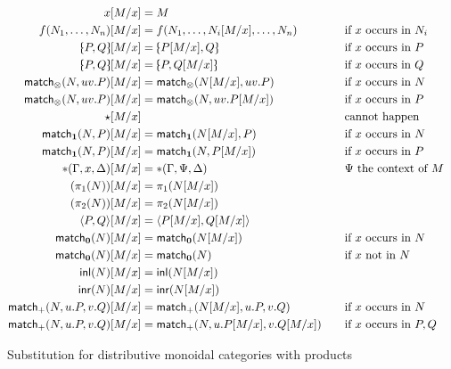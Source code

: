 \documentclass{book}
\def\ttt{\mathord{\ast}}%
\def\pair#1#2{\langle #1,#2\rangle}
\def\inl{\mathsf{inl}}
\def\inr{\mathsf{inr}}
\def\case{\mathsf{match}_+}
\def\match{\mathsf{match}}
\def\zero{\mathbf{0}}
\def\abort{\match_{\zero}}
\def\one{\mathbf{1}}
\def\ott{\mathord{\star}}%
\let\tensor\otimes
\def\tpair#1#2{\text{\textlquill} #1,#2 \text{\textrquill}}%
\begin{document}
\begin{figure}
  \centering
  \begin{alignat*}{2}
    x[M/x] &= M\\
    f(N_1,\dots,N_n)[M/x] &= f(N_1,\dots,N_i[M/x],\dots,N_n) &&\quad\text{if $x$ occurs in $N_i$}\\
    \tpair P Q[M/x] &= \tpair{P[M/x]}{Q} &&\quad\text{if $x$ occurs in $P$}\\
    \tpair P Q[M/x] &= \tpair{P}{Q[M/x]} &&\quad\text{if $x$ occurs in $Q$}\\
    \match_\tensor(N,uv.P)[M/x] &= \match_\tensor(N[M/x],uv.P) &&\quad\text{if $x$ occurs in $N$}\\
    \match_\tensor(N,uv.P)[M/x] &= \match_\tensor(N,uv.P[M/x]) &&\quad\text{if $x$ occurs in $P$}\\
    \ott[M/x] &&&\quad\text{cannot happen}\\
    \match_\one(N,P)[M/x] &= \match_\one(N[M/x],P) &&\quad\text{if $x$ occurs in $N$}\\
    \match_\one(N,P)[M/x] &= \match_\one(N,P[M/x]) &&\quad\text{if $x$ occurs in $P$}\\
    \ttt(\Gamma,x,\Delta)[M/x] &= \ttt(\Gamma,\Psi,\Delta) &&\quad\text{$\Psi$ the context of $M$}\\
    (\pi_1(N))[M/x] &= \pi_1(N[M/x])\\
    (\pi_2(N))[M/x] &= \pi_2(N[M/x])\\
    \pair{P}{Q}[M/x] &= \pair{P[M/x]}{Q[M/x]}\\
    \abort(N)[M/x] &= \abort(N[M/x]) &&\quad\text{if $x$ occurs in $N$}\\
    \abort(N)[M/x] &= \abort(N) &&\quad\text{if $x$ not in $N$}\\
    \inl(N)[M/x] &= \inl(N[M/x])\\
    \inr(N)[M/x] &= \inr(N[M/x])\\
    \case(N,u.P,v.Q)[M/x] &= \case(N[M/x],u.P,v.Q) &&\quad\text{if $x$ occurs in $N$}\\
    \case(N,u.P,v.Q)[M/x] &= \case(N,u.P[M/x],v.Q[M/x]) &&\quad\text{if $x$ occurs in $P,Q$}
  \end{alignat*}
  \caption{Substitution for distributive monoidal categories with products}
  \label{fig:moncat-prod-coprod-sub}
\end{figure}
\end{document}
